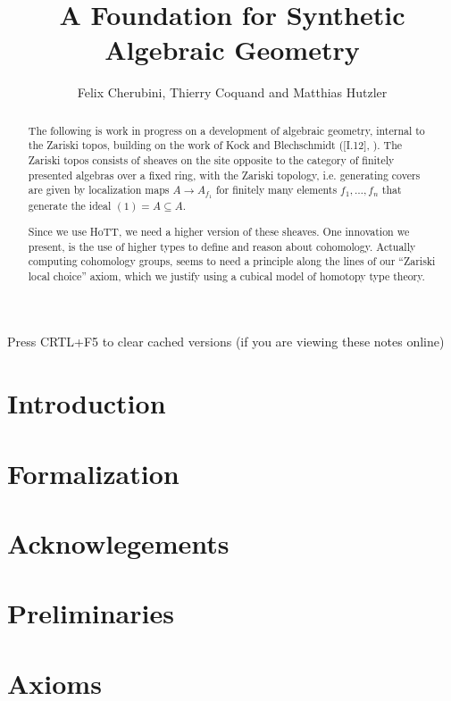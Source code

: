 \documentclass{../util/zariski}
\title{A Foundation for Synthetic Algebraic Geometry}
\author{Felix Cherubini, Thierry Coquand and Matthias Hutzler}
\begin{document}
\maketitle

\begin{center}
  \color{purple}
  \large{Press CRTL+F5 to clear cached versions}
  \large{(if you are viewing these notes online)}
\end{center}

\begin{abstract}
  The following is work in progress on a development of algebraic geometry, internal to the Zariski topos, building on the work of Kock and Blechschmidt (\cite{kock-sdg}[I.12], \cite{ingo-thesis}).
  The Zariski topos consists of sheaves on the site opposite to the category of finitely presented algebras over a fixed ring, with the Zariski topology, i.e. generating covers are given by localization maps $A\to A_{f_1}$ for finitely many elements $f_1,\dots,f_n$ that generate the ideal $(1)=A\subseteq A$.

  Since we use HoTT, we need a higher version of these sheaves.
  One innovation we present, is the use of higher types to define and reason about cohomology.
  Actually computing cohomology groups, seems to need a principle along the lines of our ``Zariski local choice'' axiom,
  which we justify using a cubical model of homotopy type theory.
\end{abstract}

\tableofcontents

\section*{Introduction}


\section*{Formalization}


\section*{Acknowlegements}


\section{Preliminaries}


\section{Axioms}

\end{document}
